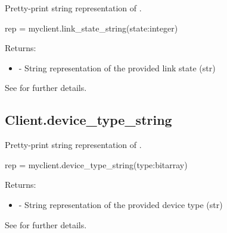 \summary

Pretty-print string representation of .

\format

\pyspecificstart
\begin{codepar}
rep = myclient.link_state_string(state:integer)
\end{codepar}
\pyspecificend

\begin{arglist}
\end{arglist}

Returns:
\begin{itemize}
    \item {} - String representation of the provided link state (str)
\end{itemize}

See  for further details.



\subsection{Client.device_type_string}

\summary

Pretty-print string representation of .

\format

\pyspecificstart
\begin{codepar}
rep = myclient.device_type_string(type:bitarray)
\end{codepar}
\pyspecificend

\begin{arglist}
\end{arglist}

Returns:
\begin{itemize}
    \item {} - String representation of the provided device type (str)
\end{itemize}

See  for further details.



